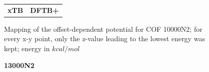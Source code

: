 \begin{figure}[H]
{\begin{tabular}{cc}
\textbf{\Large{xTB}}\par\medskip & \textbf{\Large{DFTB+}}\par\medskip\\
\end{tabular}}
\caption{Mapping of the offset-dependent potential for COF 10000N2; for every x-y point, only the z-value leading to the lowest energy was kept; energy in $kcal/mol$}
\label{fig:10maps}
\end{figure}



\begin{figure}[H]
\vspace{2cm}
\begin{centering}
\textbf{\LARGE{13000N2}}\par\medskip
\end{centering}
\end{figure}

